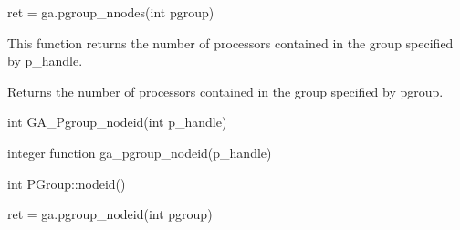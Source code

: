 \documentclass[10pt]{article}
\begin{document}
\begin{pyapi}
\begin{pycode}
ret = ga.pgroup_nnodes(int pgroup)
\end{pycode}
\begin{funcargs}
\end{funcargs}
\end{pyapi}

\local

\begin{desc}
This function returns the number of processors contained in the group specified
by p_handle.

Returns the number of processors contained in the group specified by
pgroup.
\end{desc}



\begin{capi}
\begin{ccode}
int GA_Pgroup_nodeid(int p_handle)
\end{ccode}
\begin{funcargs}
\end{funcargs}
\end{capi}

\begin{fapi}
\begin{fcode}
integer function ga_pgroup_nodeid(p_handle)
\end{fcode}
\begin{funcargs}
\end{funcargs}
\end{fapi}

\begin{cxxapi}
\begin{cxxcode}
int PGroup::nodeid()
\end{cxxcode}
\end{cxxapi}

\begin{pyapi}
\begin{pycode}
ret = ga.pgroup_nodeid(int pgroup)
\end{pycode}
\begin{funcargs}
\end{funcargs}
\end{pyapi}
\end{document}
